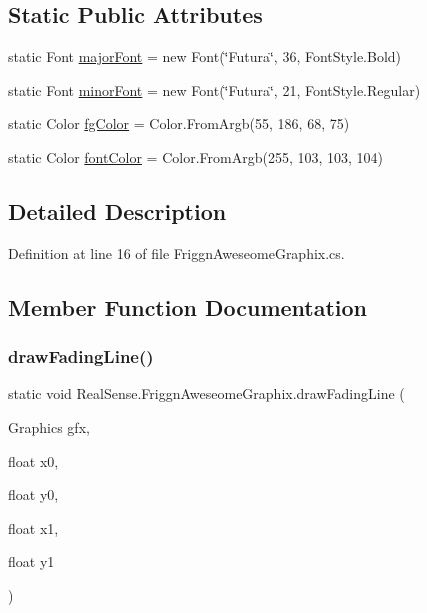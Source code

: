 \subsection*{Static Public Attributes}
\begin{DoxyCompactItemize}
\item 
static Font \hyperlink{class_real_sense_1_1_friggn_aweseome_graphix_ad34adf2179722fa8080e9f4032bc43ce}{major\+Font} = new Font(\char`\"{}Futura\char`\"{}, 36, Font\+Style.\+Bold)
\item 
static Font \hyperlink{class_real_sense_1_1_friggn_aweseome_graphix_a9d2afacf158345fcecf1b25b895806a2}{minor\+Font} = new Font(\char`\"{}Futura\char`\"{}, 21, Font\+Style.\+Regular)
\item 
static Color \hyperlink{class_real_sense_1_1_friggn_aweseome_graphix_a167341ae00dc0a13928b8b26de77e277}{fg\+Color} = Color.\+From\+Argb(55, 186, 68, 75)
\item 
static Color \hyperlink{class_real_sense_1_1_friggn_aweseome_graphix_a80a40fcc2a193f1d3a2a7ba3d9d4eb2b}{font\+Color} = Color.\+From\+Argb(255, 103, 103, 104)
\end{DoxyCompactItemize}


\subsection{Detailed Description}


Definition at line 16 of file Friggn\+Aweseome\+Graphix.\+cs.



\subsection{Member Function Documentation}
\mbox{\label{class_real_sense_1_1_friggn_aweseome_graphix_a8aa4c7bc30a55548f69d9a6beeba102f}} 
\subsubsection{\texorpdfstring{draw\+Fading\+Line()}{drawFadingLine()}}
{\footnotesize\ttfamily static void Real\+Sense.\+Friggn\+Aweseome\+Graphix.\+draw\+Fading\+Line (\begin{DoxyParamCaption}\item[{Graphics}]{gfx,  }\item[{float}]{x0,  }\item[{float}]{y0,  }\item[{float}]{x1,  }\item[{float}]{y1 }\end{DoxyParamCaption})\hspace{0.3cm}{\ttfamily [static]}}



